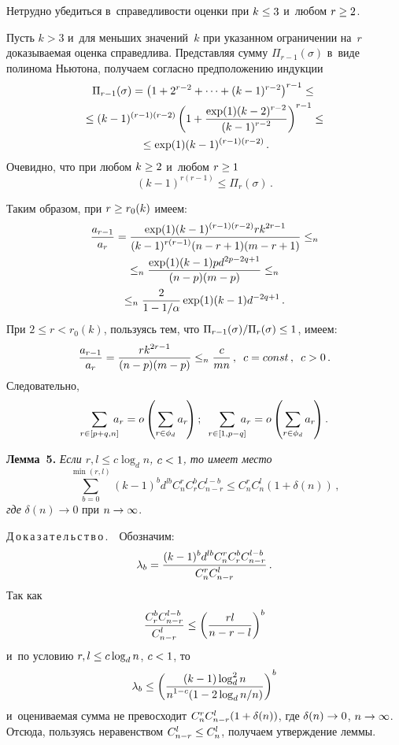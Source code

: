 \begin{multicols}{2}
    Нетрудно убедиться в~справедливости оценки при $k\hm\leq 3$ и~любом 
$r\hm\geq 2$. 
    
    Пусть $k>3$ и~для меньших значений~$k$ при указанном ограничении 
на~$r$ доказываемая оценка справедлива. Представляя сумму $\Pi_{r-
1}(\sigma)$ в~виде полинома Ньютона, получаем согласно предположению 
индукции
    \begin{multline*}
    \Pi_{r-1}(\sigma)= \left( 1+2^{r-2}+\cdots + (k-1)^{r-2}\right)^{r-1}\leq{}\\
    {}\leq 
    (k-1)^{(r-1)(r-2)} \left( 1+\displaystyle\frac{\displaystyle \exp(1) (k-2)^{r-2}\mathstrut}{\displaystyle (k-1)^{r-2}\mathstrut}\right)^{r-1}\leq{}\\
    {}\leq
    \exp(1) (k-1)^{(r-1)(r-2)}\,.
    \end{multline*}
        Очевидно, что при любом $k\hm\geq 2$ и~любом $r\hm\geq 1$
    $$
    (k-1)^{r(r-1)}\leq \Pi_r(\sigma)\,.
    $$
    
    Таким образом, при $r\hm\geq r_0(k)$ имеем:
    \begin{multline*}
    \displaystyle\frac{\displaystyle a_{r-1}\mathstrut}{\displaystyle a_r\mathstrut}= \displaystyle\frac{\displaystyle \exp(1) (k-1)^{(r-1)(r-2)} rk^{2r-1}\mathstrut}{\displaystyle (k-1)^{r(r-1)} (n-
r+1) (m-r+1)\mathstrut}\leq_n\\
    \leq_n \displaystyle\frac{\displaystyle \exp(1) (k-1) pd^{2p-2q+1}\mathstrut}{\displaystyle (n-p)(m-p)\mathstrut}\leq_n\\
    \leq_n \displaystyle\frac{\displaystyle 2\mathstrut}{\displaystyle 1-1/\alpha\mathstrut}\exp (1) (k-1) d^{-2q+1}\,.
    \end{multline*}
        При $2\leq r< r_0(k)$, пользуясь тем, что $\Pi_{r-
1}(\sigma)/\Pi_r(\sigma)\hm\leq 1$, имеем:
    $$
    \displaystyle\frac{\displaystyle a_{r-1}\mathstrut}{\displaystyle a_r\mathstrut}=\displaystyle\frac{\displaystyle rk^{2r-1}\mathstrut}{\displaystyle (n-p)(m-p)\mathstrut} \leq_n \displaystyle\frac{\displaystyle c\mathstrut}{\displaystyle mn\mathstrut}\,,\enskip 
c=const\,,\enskip c>0\,.
    $$
    Следовательно, 
    $$
    \sum\limits_{r\in [p+q,n]} \!\!\!\! a_r =o\left( \sum\limits_{r\in \phi_d} 
a_r\!\right);\enskip
    \sum\limits_{r\in [1, p-q]}\!\!\!\! a_r =o\left( \sum\limits_{r\in \phi_d} 
    a_r\!\right).
    $$
    
    \noindent
    \textbf{Лемма~5.} 
    \textit{Если $r, l\leq  c\log_d n$, $c\hm<1$, то имеет место}
    $$
    \sum\limits_{b=0}^{\min(r,l)} (k-1)^b d^{lb} C_n^r  C_r^b C_{n-r}^{l-b}\leq 
C_n^r C_n^l (1+\delta(n))\,,
    $$
    \textit{где} $\delta(n)\to 0$ при $n\hm\to\infty$.
    
    \noindent
    Д\,о\,к\,а\,з\,а\,т\,е\,л\,ь\,с\,т\,в\,о\,.\ \ Обозначим:
    $$
    \lambda_b = 
\displaystyle\frac{\displaystyle (k-1)^b d^{lb} C_n^r C_r^b C_{n-r}^{l-b}\mathstrut}{\displaystyle C_n^r C^l_{n-r}\mathstrut}\,. 
$$
    Так как
    $$
    \displaystyle\frac{\displaystyle C_r^b C_{n-r}^{l-b}\mathstrut}{\displaystyle C^l_{n-r}\mathstrut} \leq \left( \displaystyle\frac{\displaystyle rl\mathstrut}{\displaystyle n-r-l\mathstrut}\right)^b
    $$
    и~по условию $r, l\hm\leq c \log_d n$, $c\hm<1$, то 
    $$
    \lambda_b\leq \left( \displaystyle\frac{\displaystyle (k-1)\log_d^2 n\mathstrut}{\displaystyle n^{1-c} (1-2\log_d n/n)\mathstrut}\right)^b
    $$
и~оцениваемая сумма не превосходит $C_n^r C^l_{n-r}(1\hm+ \delta(n))$, где 
$\delta(n)\hm\to 0$, $n\hm\to \infty$. Отсюда, пользуясь неравенством $C^l_{n-
r}\hm\leq C^l_n$, получаем утверждение леммы.


\end{multicols}
